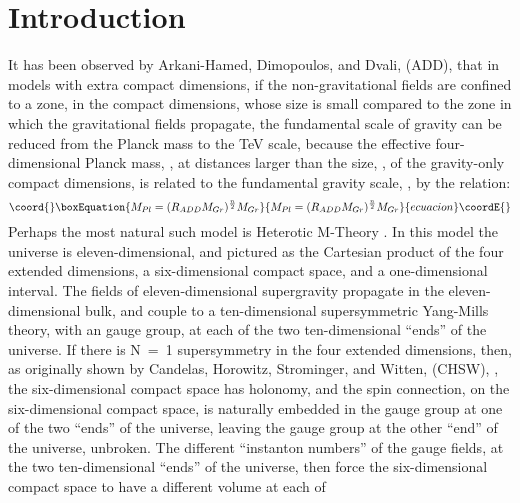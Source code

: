 \documentclass[a4paper,12pt,oneside]{article}
\begin{document}
\vspace{3.7cm}

\section{Introduction}

It has been observed by Arkani-Hamed, Dimopoulos, and Dvali, (ADD), 
\cite{ADD1, ADD2} that in models with \coordHE{} extra compact dimensions, 
if the
non-gravitational fields are confined to a zone, in the compact
dimensions, whose size is small compared to the zone in which the
gravitational fields propagate, the fundamental scale of gravity can
be reduced from the Planck mass to the TeV scale, because the 
effective four-dimensional Planck mass, \coordHE{}, at distances 
larger than the size, \coordHE{}, of the gravity-only compact 
dimensions, is 
related to the fundamental gravity scale, \coordHE{}, by the relation:
\begin{equation}\coord{}\boxEquation{\label{ADD equation}
M_{Pl} = (R_{ADD}M_{Gr})^{\frac{n}{2}}M_{Gr}
}{M_{Pl} = (R_{ADD}M_{Gr})^{\frac{n}{2}}M_{Gr}
}{ecuacion}\coordE{}\end{equation}
Perhaps the most natural such model is Heterotic M-Theory \cite{HW1,
HW2}.  In this model the universe is eleven-dimensional, and 
pictured as
the Cartesian product of the four extended dimensions, a
six-dimensional compact space, and a one-dimensional interval.  The
fields of eleven-dimensional supergravity propagate in the
eleven-dimensional bulk, and couple to a ten-dimensional
supersymmetric Yang-Mills theory, with an \coordHE{} gauge group,
at each of the two ten-dimensional ``ends'' of the universe.  If
there is \mbox{N = 1} supersymmetry in the four extended 
dimensions, then,
as originally shown by Candelas, Horowitz, Strominger, and Witten,
(CHSW), \cite{CHSW}, the six-dimensional compact space has 
\coordHE{} holonomy, and the spin connection, on the 
six-dimensional compact space, is naturally embedded in the 
\coordHE{} gauge group at one of the two ``ends'' of the 
universe, leaving the \coordHE{} gauge group at the other 
``end'' of the universe, unbroken.  The different ``instanton 
numbers'' of the \coordHE{} gauge fields, at the two 
ten-dimensional ``ends'' of the universe, then force the 
six-dimensional compact space to have a different volume at each of 
\end{document}
